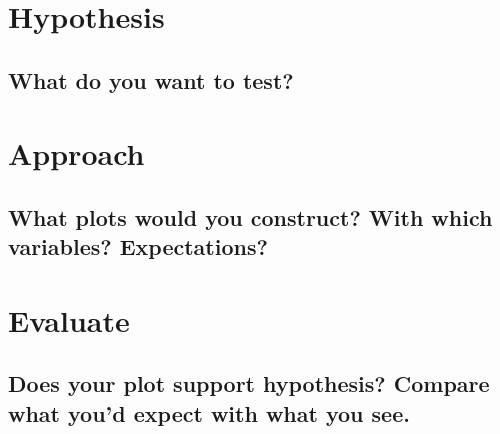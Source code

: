 \documentclass[12 pt]{article}
\begin{document}
\section{Hypothesis}
\subsection*{What do you want to test?}

\section{Approach}
\subsection*{What plots would you construct? With which variables? Expectations?}

\section{Evaluate}
\subsection*{Does your plot support hypothesis? Compare what you'd expect with what you see.}
\end{document}
